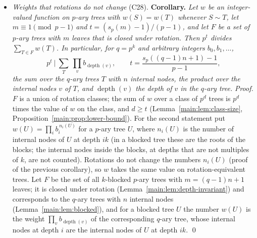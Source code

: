 \documentclass[11pt]{article}
\theoremstyle{definition}
\theoremstyle{remark}
\numberwithin{equation}{section}
\numberwithin{figure}{section}
\begin{document}
\begin{itemize}[itemsep=1pt]
 The sum of these products over all profiles with $\sum_in_i=n$ is $C_n^{(q)}$, so the corollary refines the
 divisibility half of the theorem; it is a statement about binomial coefficients, and its proof uses no
 valuation of a factorial. For the formal proof this is supported by a listing that the Lean build prints
 (file ): the declarations in the full closure of the theorem, through Mathlib
 and the core library, whose names contain one of nine strings such as \texttt{multiplicity\_choose},
 \texttt{multiplicity\_factorial}, \texttt{padicval}, \texttt{legendre}, \texttt{kummer} or \texttt{lucas}
 (Section~\ref{sec:lean}). The list is empty. The statement was computed beforehand for every profile
 in the ranges of Section~\ref{sec:computations}. It was not found in the four papers that an AI system read in full early
 in the project to look for overlap; no other search of the literature was made for it, and we do not claim
 that it is new.
\item \emph{Weights that rotations do not change} (C28). \textbf{Corollary.} \emph{Let $w$ be an
 integer-valued function on $p$-ary trees with $w(S)=w(T)$ whenever $S\sim T$, let $m\equiv1\pmod{p-1}$ and
 $t=(s_p(m)-1)/(p-1)$, and let $F$ be a set of $p$-ary trees with $m$ leaves that is closed under rotation.
 Then $p^t$ divides $\sum_{T\in F}w(T)$. In particular, for $q=p^k$ and arbitrary integers $b_0,b_1,\dots$,}
 \[
  p^t\ \Big|\ \sum_{T}\ \prod_{v}b_{\operatorname{depth}(v)},\qquad t=\frac{s_p((q-1)n+1)-1}{p-1},
 \]
 \emph{the sum over the $q$-ary trees $T$ with $n$ internal nodes, the product over the internal nodes $v$
 of $T$, and $\operatorname{depth}(v)$ the depth of $v$ in the $q$-ary tree.}
 \emph{Proof.} $F$ is a union of rotation classes; the sum of $w$ over a class of $p^d$ trees is $p^d$ times
 the value of $w$ on the class, and $d\ge t$ (Lemma~\ref{main:lem:class-size},
 Proposition~\ref{main:prop:lower-bound}). For the second statement put
 $w(U)=\prod_ib_i^{\,n_i(U)}$ for a $p$-ary tree $U$, where $n_i(U)$ is the number of internal nodes of $U$ at
 depth $ik$ (in a blocked tree these are the roots of the blocks; the internal nodes inside the blocks, at
 depths that are not multiples of $k$, are not counted). Rotations do not change the numbers $n_i(U)$ (proof of the previous corollary), so $w$ takes the
 same value on rotation-equivalent trees. Let $F$ be the set of all $k$-blocked $p$-ary trees with
 $m=(q-1)n+1$ leaves; it is closed under rotation (Lemma~\ref{main:lem:depth-invariant}) and corresponds to the
 $q$-ary trees with $n$ internal nodes (Lemma~\ref{main:lem:blocked}), and for a blocked tree $U$ the number
 $w(U)$ is the weight $\prod_vb_{\operatorname{depth}(v)}$ of the corresponding $q$-ary tree, whose internal
 nodes at depth $i$ are the internal nodes of $U$ at depth $ik$. \qed


\end{itemize}
\end{document}
